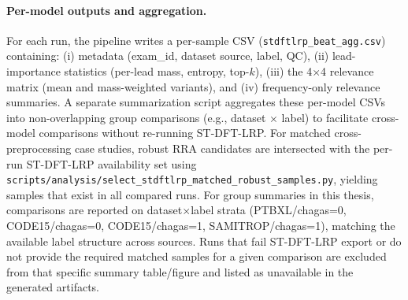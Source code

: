 \paragraph{Per-model outputs and aggregation.}
For each run, the pipeline writes a per-sample CSV (\texttt{stdftlrp\_beat\_agg.csv}) containing:
(i) metadata (exam\_id, dataset source, label, QC),
(ii) lead-importance statistics (per-lead mass, entropy, top-$k$),
(iii) the 4$\times$4 relevance matrix (mean and mass-weighted variants), and
(iv) frequency-only relevance summaries.
A separate summarization script aggregates these per-model CSVs into non-overlapping group comparisons (e.g., dataset $\times$ label) to facilitate cross-model comparisons without re-running ST-DFT-LRP.
For matched cross-preprocessing case studies, robust RRA candidates are intersected with the per-run ST-DFT-LRP availability set using \texttt{scripts/analysis/select\_stdftlrp\_matched\_robust\_samples.py}, yielding samples that exist in all compared runs.
For group summaries in this thesis, comparisons are reported on dataset$\times$label strata (PTBXL/chagas=0, CODE15/chagas=0, CODE15/chagas=1, SAMITROP/chagas=1), matching the available label structure across sources.
Runs that fail ST-DFT-LRP export or do not provide the required matched samples for a given comparison are excluded from that specific summary table/figure and listed as unavailable in the generated artifacts.
